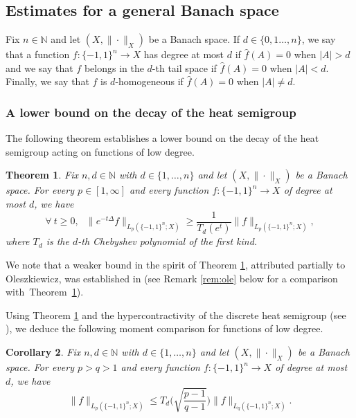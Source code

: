 \documentclass[11pt,reqno]{amsart}
\renewcommand{\leq}{\leqslant}
\renewcommand{\geq}{\geqslant}
\newcommand{\1}{\mathbf 1}
\newtheorem{theorem}{Theorem}
\newtheorem{corollary}[theorem]{Corollary}
\theoremstyle{remark}
\newcommand{\N}{\mathbb N}
\begin{document}

\subsection{Estimates for a general Banach space} \label{subsec:1.1} Fix $n\in\N$ and let $(X,\|\cdot\|_X)$ be a Banach space. If $d\in\{0,1\ldots,n\}$, we say that a function $f:\{-1,1\}^n\to X$ has degree at most $d$ if $\widehat{f}(A)=0$ when $|A|>d$ and we say that $f$ belongs in the $d$-th tail space if $\widehat{f}(A)=0$ when $|A|<d$. Finally, we say that $f$ is $d$-homogeneous if $\widehat{f}(A)=0$ when $|A|\neq d$.

\subsubsection{A lower bound on the decay of the heat semigroup} The following theorem establishes a lower bound on the decay of the heat semigroup acting on functions of low degree.

\begin{theorem} \label{thm:reverseheatgeneral}
Fix $n,d\in\N$ with $d\in\{1,\ldots,n\}$ and let $(X,\|\cdot\|_X)$ be a Banach space. For every $p\in[1,\infty]$ and every function $f:\{-1,1\}^n \to X$ of degree at most $d$, we have
\begin{equation} \label{eq:reverseheatgeneral}
\forall \ t\geq0, \ \ \ \|e^{-t\Delta}f\|_{L_p(\{-1,1\}^n;X)} \geq \frac{1}{T_d(e^t)} \|f\|_{L_p(\{-1,1\}^n;X)},
\end{equation}
where $T_d$ is the $d$-th Chebyshev polynomial of the first kind.
\end{theorem}

We note that a weaker bound in the spirit of Theorem \ref{thm:reverseheatgeneral}, attributed partially to Oleszkiewicz, was established in \cite[Lemma~5.4]{FHKL16} (see Remark \ref{rem:ole} below for a comparison \mbox{with Theorem \ref{thm:reverseheatgeneral}).}

Using Theorem \ref{thm:reverseheatgeneral} and the hypercontractivity of the discrete heat semigroup (see \cite{Bon70}), we deduce the following moment comparison for functions of low degree.

\begin{corollary} \label{cor:realchaos}
Fix $n,d\in\N$ with $d\in\{1,\ldots,n\}$ and let $(X,\|\cdot\|_X)$ be a Banach space. For every $p>q>1$ and every function $f:\{-1,1\}^n\to X$ of degree at most $d$, we have
\begin{equation} \label{eq:realchaos}
\|f\|_{L_p(\{-1,1\}^n;X)} \leq T_d\Big(\sqrt{\frac{p-1}{q-1}}\Big) \|f\|_{L_q(\{-1,1\}^n;X)}.
\end{equation}
\end{corollary}
\end{document}
